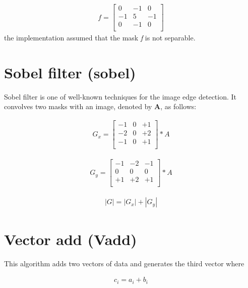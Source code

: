 \documentclass[]{report}
\begin{document}
\begin{align}
f=\begin{bmatrix}
0       & -1  & 0 \\
-1       & 5 & -1  \\
0       & -1 & 0  \\
\end{bmatrix}
\end{align}
the implementation assumed that the mask \textit{f} is not separable. 

\section{Sobel filter (sobel)}
Sobel filter is one of well-known techniques for the image edge detection.
It convolves two masks with an image, denoted by \textbf{A}, as follows: 


\begin{align}
G_x=\begin{bmatrix}
-1       & 0  & +1 \\
-2       & 0 & +2  \\
-1       & 0 & +1  \\
\end{bmatrix} * A
\end{align}


\begin{align}
G_y=\begin{bmatrix}
-1       & -2  & -1 \\
0        & 0   &  0  \\
+1       & +2  & +1  \\
\end{bmatrix} * A
\end{align}

\begin{align}
 \left|G\right|=\left|G_x\right|+\left|G_y\right|
\end{align}

\section{Vector add (Vadd)}

This algorithm adds two vectors of data and generates the third vector where 

\begin{align}
c_i=a_i+b_i
\end{align}




\end{document}
